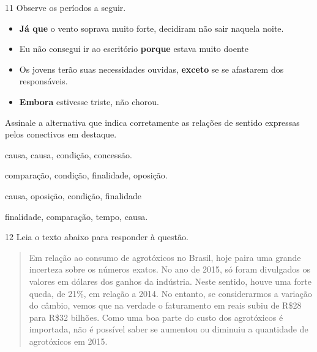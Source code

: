 \num{11} Observe os períodos a seguir.

\begin{itemize}

    \item \textbf{Já que} o vento soprava muito forte, decidiram não sair
naquela noite.

    \item Eu não consegui ir ao escritório \textbf{porque} estava muito doente

    \item Os jovens terão suas necessidades ouvidas, \textbf{exceto} se se
afastarem dos responsáveis.

    \item \textbf{Embora} estivesse triste, não chorou.

\end{itemize}

Assinale a alternativa que indica corretamente as relações de sentido
expressas pelos conectivos em destaque.

\begin{escolha}

    \item causa, causa, condição, concessão.

    \item comparação, condição, finalidade, oposição.

    \item causa, oposição, condição, finalidade

    \item finalidade, comparação, tempo, causa.

\end{escolha}

\num{12} Leia o texto abaixo para responder à questão. 

\begin{quote}

Em relação ao consumo de agrotóxicos no Brasil, hoje paira uma grande
incerteza sobre os números exatos. No ano de 2015, só foram divulgados
os valores em dólares dos ganhos da indústria. Neste sentido, houve uma
forte queda, de 21\%, em relação a 2014. No entanto, se considerarmos a
variação do câmbio, vemos que na verdade o faturamento em reais subiu de
R\$28 para R\$32 bilhões. Como uma boa parte do custo dos agrotóxicos é
importada, não é possível saber se aumentou ou diminuiu a quantidade de
agrotóxicos em 2015.

\end{quote}

